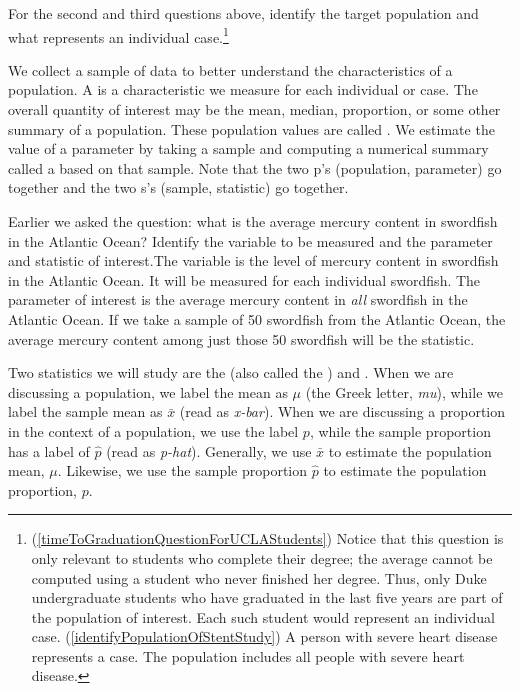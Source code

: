 \begin{exercise} \label{identifyingThePopulationForTwoQuestionsInPopAndSampSubsection}
For the second and third questions above, identify the target population and what represents an individual case.\footnote{(\ref{timeToGraduationQuestionForUCLAStudents}) Notice that this question is only relevant to students who complete their degree; the average cannot be computed using a student who never finished her degree. Thus, only Duke undergraduate students who have graduated in the last five years are part of the population of interest. Each such student would represent an individual case. (\ref{identifyPopulationOfStentStudy}) A person with severe heart disease represents a case. The population includes all people with severe heart disease.}
\end{exercise}

We collect a sample of data to better understand the characteristics of a population. A  is a characteristic we measure for each individual or case. The overall quantity of interest may be the mean, median, proportion, or some other summary of a population. These population values are called . We estimate the value of a parameter by taking a sample and computing a numerical summary called a  based on that sample. Note that the two p's (population, parameter) go together and the two s's (sample, statistic) go together.

\begin{example}{Earlier we asked the question: what is the average mercury content in swordfish in the Atlantic Ocean? Identify the variable to be measured and the parameter and statistic of interest.}The variable is the level of mercury content in swordfish in the Atlantic Ocean. It will be measured for each individual swordfish. The parameter of interest is the average mercury content in \emph{all} swordfish in the Atlantic Ocean. If we take a sample of 50 swordfish from the Atlantic Ocean, the average mercury content among just those 50 swordfish will be the statistic.
\end{example}

Two statistics we will study are the  (also called the ) and . When we are discussing a population, we label the mean as $\mu$ (the Greek letter, \emph{mu}), while we label the sample mean as $\bar{x}$ (read as \emph{x-bar}). When we are discussing a proportion in the context of a population, we use the label $p$, while the sample proportion has a label of $\hat{p}$ (read as \emph{p-hat}). Generally, we use $\bar{x}$ to estimate the population mean, $\mu$. Likewise, we use the sample proportion $\hat{p}$ to estimate the population proportion, $p$.

